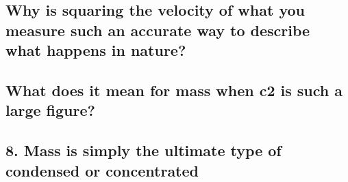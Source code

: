 \subsection*{Why is squaring the velocity of what you measure such an accurate way to describe what happens in nature?}


\subsection*{What does it mean for mass when c2 is such a large figure?}

\subsection*{8. Mass is simply the ultimate type of condensed or concentrated}
